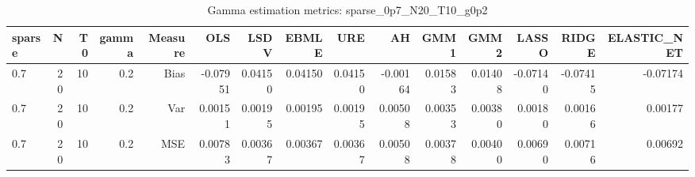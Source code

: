 \begin{table}[!htbp]\centering
\caption{Gamma estimation metrics: sparse_0p7_N20_T10_g0p2}
\label{tab:table1_sparse_0p7_N20_T10_g0p2}
\begin{tabular}{lrrrrrrrrrrrrrr}
\hline
sparse & N & T0 & gamma & Measure & OLS & LSDV & EBMLE & URE & AH & GMM1 & GMM2 & LASSO & RIDGE & ELASTIC_NET \\
\hline
0.7 & 20 & 10 & 0.2 & Bias & -0.07951 & 0.04150 & 0.04150 & 0.04150 & -0.00164 & 0.01583 & 0.01408 & -0.07140 & -0.07415 & -0.07174 \\
0.7 & 20 & 10 & 0.2 & Var & 0.00151 & 0.00195 & 0.00195 & 0.00195 & 0.00508 & 0.00353 & 0.00380 & 0.00180 & 0.00166 & 0.00177 \\
0.7 & 20 & 10 & 0.2 & MSE & 0.00783 & 0.00367 & 0.00367 & 0.00367 & 0.00508 & 0.00378 & 0.00400 & 0.00690 & 0.00716 & 0.00692 \\
\hline
\end{tabular}
\end{table}


